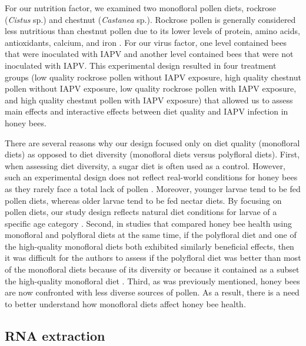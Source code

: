 \documentclass{bmcart}
\begin{document}
\begin{linenumbers}
\begin{doublespacing}
For our nutrition factor, we examined two monofloral pollen diets, rockrose (\textit{Cistus} sp.) and chestnut (\textit{Castanea} sp.). Rockrose pollen is generally considered less nutritious than chestnut pollen due to its lower levels of protein, amino acids, antioxidants, calcium, and iron \cite{adamInt, DiPasquale}. For our virus factor, one level contained bees that were inoculated with IAPV and another level contained bees that were not inoculated with IAPV. This experimental design resulted in four treatment groups (low quality rockrose pollen without IAPV exposure, high quality chestnut pollen without IAPV exposure, low quality rockrose pollen with IAPV exposure, and high quality chestnut pollen with IAPV exposure) that allowed us to assess main effects and interactive effects between diet quality and IAPV infection in honey bees.

There are several reasons why our design focused only on diet quality (monofloral diets) as opposed to diet diversity (monofloral diets versus polyfloral diets). First, when assessing diet diversity, a sugar diet is often used as a control. However, such an experimental design does not reflect real-world conditions for honey bees as they rarely face a total lack of pollen \cite{DiPasquale}. Moreover, younger larvae tend to be fed pollen diets, whereas older larvae tend to be fed nectar diets. By focusing on pollen diets, our study design reflects natural diet conditions for larvae of a specific age category \cite{ageMatters}. Second, in studies that compared honey bee health using monofloral and polyfloral diets at the same time, if the polyfloral diet and one of the high-quality monofloral diets both exhibited similarly beneficial effects, then it was difficult for the authors to assess if the polyfloral diet was better than most of the monofloral diets because of its diversity or because it contained as a subset the high-quality monofloral diet \cite{DiPasquale}. Third, as was previously mentioned, honey bees are now confronted with less diverse sources of pollen. As a result, there is a need to better understand how monofloral diets affect honey bee health.

\subsection*{RNA extraction}


\end{doublespacing}
\end{linenumbers}
\end{document}
